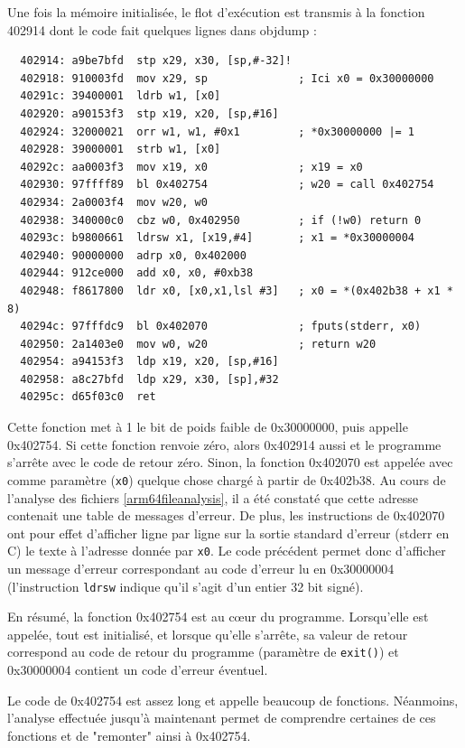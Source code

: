 \documentclass[a4paper,10pt]{article}
\begin{document}
Une fois la mémoire initialisée, le flot d'exécution est transmis à la fonction 402914 dont le code fait quelques lignes dans objdump :

\begin{verbatim}
  402914: a9be7bfd  stp x29, x30, [sp,#-32]!
  402918: 910003fd  mov x29, sp              ; Ici x0 = 0x30000000
  40291c: 39400001  ldrb w1, [x0]
  402920: a90153f3  stp x19, x20, [sp,#16]
  402924: 32000021  orr w1, w1, #0x1         ; *0x30000000 |= 1
  402928: 39000001  strb w1, [x0]
  40292c: aa0003f3  mov x19, x0              ; x19 = x0
  402930: 97ffff89  bl 0x402754              ; w20 = call 0x402754
  402934: 2a0003f4  mov w20, w0
  402938: 340000c0  cbz w0, 0x402950         ; if (!w0) return 0
  40293c: b9800661  ldrsw x1, [x19,#4]       ; x1 = *0x30000004
  402940: 90000000  adrp x0, 0x402000
  402944: 912ce000  add x0, x0, #0xb38
  402948: f8617800  ldr x0, [x0,x1,lsl #3]   ; x0 = *(0x402b38 + x1 * 8)
  40294c: 97fffdc9  bl 0x402070              ; fputs(stderr, x0)
  402950: 2a1403e0  mov w0, w20              ; return w20
  402954: a94153f3  ldp x19, x20, [sp,#16]
  402958: a8c27bfd  ldp x29, x30, [sp],#32
  40295c: d65f03c0  ret
\end{verbatim}

Cette fonction met à 1 le bit de poids faible de 0x30000000, puis appelle 0x402754. Si cette fonction renvoie zéro, alors 0x402914 aussi et le programme s'arrête avec le code de retour zéro. Sinon, la fonction 0x402070 est appelée avec comme paramètre (\texttt{x0}) quelque chose chargé à partir de 0x402b38. Au cours de l'analyse des fichiers \ref{arm64fileanalysis}, il a été constaté que cette adresse contenait une table de messages d'erreur. De plus, les instructions de 0x402070 ont pour effet d'afficher ligne par ligne sur la sortie standard d'erreur (stderr en C) le texte à l'adresse donnée par \texttt{x0}. Le code précédent permet donc d'afficher un message d'erreur correspondant au code d'erreur lu en 0x30000004 (l'instruction \texttt{ldrsw} indique qu'il s'agit d'un entier 32 bit signé).

En résumé, la fonction 0x402754 est au c\oe{}ur du programme. Lorsqu'elle est appelée, tout est initialisé, et lorsque qu'elle s'arrête, sa valeur de retour correspond au code de retour du programme (paramètre de \texttt{exit()}) et 0x30000004 contient un code d'erreur éventuel.

Le code de 0x402754 est assez long et appelle beaucoup de fonctions. Néanmoins, l'analyse effectuée jusqu'à maintenant permet de comprendre certaines de ces fonctions et de "remonter" ainsi à 0x402754.
\end{document}
